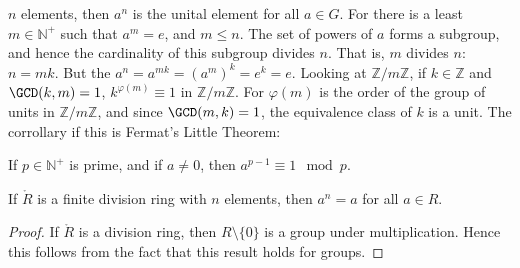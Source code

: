 \documentclass{article}                                                        %
\begin{document}
                $n$ elements, then $a^{n}$ is the unital element for all
                $a\in{G}$. For there is a least $m\in\mathbb{N}^{+}$ such that
                $a^{m}=e$, and $m\leq{n}$. The set of powers of $a$ forms a
                subgroup, and hence the cardinality of this subgroup divides
                $n$. That is, $m$ divides $n$: $n=mk$. But the
                $a^{n}=a^{mk}=(a^{m})^{k}=e^{k}=e$. Looking at
                $\mathbb{Z}/m\mathbb{Z}$, if $k\in\mathbb{Z}$ and
                $\GCD(k,m)=1$, $k^{\varphi(m)}\equiv{1}$ in
                $\mathbb{Z}/m\mathbb{Z}$. For $\varphi(m)$ is the order of the
                group of units in $\mathbb{Z}/m\mathbb{Z}$, and since
                $\GCD(m,k)=1$, the equivalence class of $k$ is a unit. The
                corrollary if this is Fermat's Little Theorem:
                \begin{theorem}
                    If $p\in\mathbb{N}^{+}$ is prime, and if $a\ne{0}$, then
                    $a^{p-1}\equiv{1}\mod{p}$.
                \end{theorem}
                \begin{theorem}
                    If $\ring{R}$ is a finite division ring with $n$ elements,
                    then $a^{n}=a$ for all $a\in{R}$.
                \end{theorem}
                \begin{proof}
                    If $\ring{R}$ is a division ring, then $R\setminus\{0\}$ is
                    a group under multiplication. Hence this follows from the
                    fact that this result holds for groups.
                \end{proof}
\end{document}

